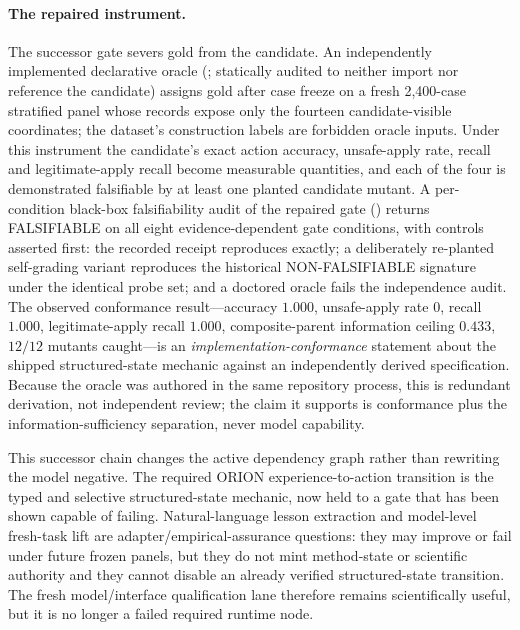 \paragraph{The repaired instrument.}
The successor gate severs gold from the candidate. An independently implemented declarative oracle (; statically audited to neither import nor reference the candidate) assigns gold after case freeze on a fresh 2,400-case stratified panel whose records expose only the fourteen candidate-visible coordinates; the dataset's construction labels are forbidden oracle inputs. Under this instrument the candidate's exact action accuracy, unsafe-apply rate, \CANNOTCHECK{} recall and legitimate-apply recall become measurable quantities, and each of the four is demonstrated falsifiable by at least one planted candidate mutant. A per-condition black-box falsifiability audit of the repaired gate () returns FALSIFIABLE on all eight evidence-dependent gate conditions, with controls asserted first: the recorded receipt reproduces exactly; a deliberately re-planted self-grading variant reproduces the historical NON-FALSIFIABLE signature under the identical probe set; and a doctored oracle fails the independence audit. The observed conformance result---accuracy $1.000$, unsafe-apply rate $0$, \CANNOTCHECK{} recall $1.000$, legitimate-apply recall $1.000$, composite-parent information ceiling $0.433$, $12/12$ mutants caught---is an \emph{implementation-conformance} statement about the shipped structured-state mechanic against an independently derived specification. Because the oracle was authored in the same repository process, this is redundant derivation, not independent review; the claim it supports is conformance plus the information-sufficiency separation, never model capability.

This successor chain changes the active dependency graph rather than rewriting the model negative. The required ORION experience-to-action transition is the typed and selective structured-state mechanic, now held to a gate that has been shown capable of failing. Natural-language lesson extraction and model-level fresh-task lift are adapter/empirical-assurance questions: they may improve or fail under future frozen panels, but they do not mint method-state or scientific authority and they cannot disable an already verified structured-state transition. The fresh model/interface qualification lane therefore remains scientifically useful, but it is no longer a failed required runtime node.

